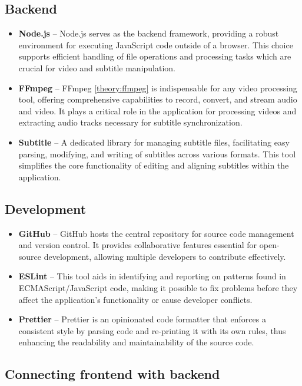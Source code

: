 \subsection{Backend}
\begin{itemize}
\item \textbf{Node.js} -- Node.js serves as the backend framework, providing a robust environment for executing JavaScript code outside of a browser. This choice supports efficient handling of file operations and processing tasks which are crucial for video and subtitle manipulation.
\item \textbf{FFmpeg} -- FFmpeg \ref{theory:ffmpeg} is indispensable for any video processing tool, offering comprehensive capabilities to record, convert, and stream audio and video. It plays a critical role in the application for processing videos and extracting audio tracks necessary for subtitle synchronization.
\item \textbf{Subtitle} -- A dedicated library for managing subtitle files, facilitating easy parsing, modifying, and writing of subtitles across various formats. This tool simplifies the core functionality of editing and aligning subtitles within the application.
\end{itemize}

\subsection{Development}
\begin{itemize}
\item \textbf{GitHub} -- GitHub hosts the central repository for source code management and version control. It provides collaborative features essential for open-source development, allowing multiple developers to contribute effectively.
\item \textbf{ESLint} -- This tool aids in identifying and reporting on patterns found in ECMAScript/JavaScript code, making it possible to fix problems before they affect the application's functionality or cause developer conflicts.
\item \textbf{Prettier} -- Prettier is an opinionated code formatter that enforces a consistent style by parsing code and re-printing it with its own rules, thus enhancing the readability and maintainability of the source code.
\end{itemize}

\subsection{Connecting frontend with backend}

